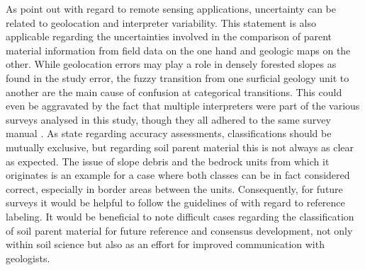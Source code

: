 \documentclass[preprint,12pt,authoryear]{elsarticle}
\begin{document}
As \cite{Olofsson2013} point out with regard to remote sensing applications, uncertainty can be related to geolocation and interpreter  variability. This statement is also applicable regarding the uncertainties involved in the comparison of parent material information from field data on the one hand and geologic maps on the other. While geolocation errors may play a role in densely forested slopes as found in the study error, the fuzzy transition from one surficial geology unit to another are the main cause of confusion at categorical transitions. This could even be aggravated by the fact that multiple interpreters were part of the various surveys analysed in this study, though they all adhered to the same survey manual \cite{Englisch1998}. As \cite{Congalton1991} state regarding accuracy assessments, classifications should be mutually exclusive, but regarding soil parent material  this is not always as clear as expected. The issue of slope debris and the bedrock units from which it originates is an example for a case where both classes can be in fact considered correct, especially in border areas between the units. Consequently, for future surveys it would be helpful to follow the guidelines of \cite{Olofsson2013}  with regard to reference labeling. It would be beneficial  to note difficult cases regarding the classification of soil parent material  for future reference and consensus development, not only within soil science but also as an effort for improved communication with geologists. 
\end{document}
